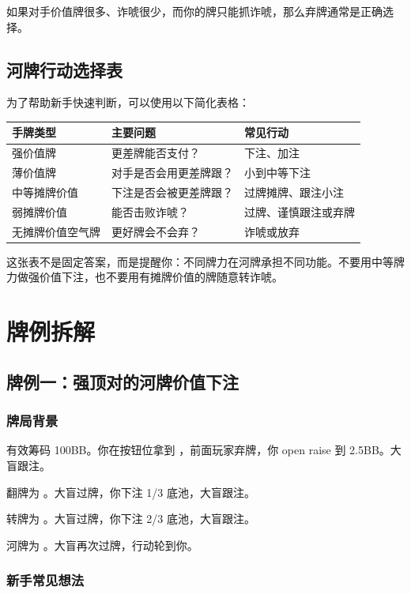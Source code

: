 如果对手价值牌很多、诈唬很少，而你的牌只能抓诈唬，那么弃牌通常是正确选择。

\subsection{河牌行动选择表}

为了帮助新手快速判断，可以使用以下简化表格：

\begin{center}
\begin{tabular}{lll}
\toprule
\textbf{手牌类型} & \textbf{主要问题} & \textbf{常见行动} \\
\midrule
强价值牌 & 更差牌能否支付？ & 下注、加注 \\
薄价值牌 & 对手是否会用更差牌跟？ & 小到中等下注 \\
中等摊牌价值 & 下注是否会被更差牌跟？ & 过牌摊牌、跟注小注 \\
弱摊牌价值 & 能否击败诈唬？ & 过牌、谨慎跟注或弃牌 \\
无摊牌价值空气牌 & 更好牌会不会弃？ & 诈唬或放弃 \\
\bottomrule
\end{tabular}
\end{center}

这张表不是固定答案，而是提醒你：不同牌力在河牌承担不同功能。不要用中等牌力做强价值下注，也不要用有摊牌价值的牌随意转诈唬。

\section{牌例拆解}

\subsection{牌例一：强顶对的河牌价值下注}

\subsubsection*{牌局背景}

有效筹码 100BB。你在按钮位拿到 ，前面玩家弃牌，你 open raise 到 2.5BB。大盲跟注。

翻牌为 。大盲过牌，你下注 1/3 底池，大盲跟注。

转牌为 。大盲过牌，你下注 2/3 底池，大盲跟注。

河牌为 。大盲再次过牌，行动轮到你。

\subsubsection*{新手常见想法}

